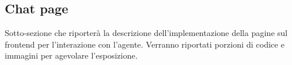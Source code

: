 \subsection{Chat page}

Sotto-sezione che riporterà la descrizione dell'implementazione della pagine sul frontend per l'interazione con l'agente.
Verranno riportati porzioni di codice e immagini per agevolare l'esposizione.
